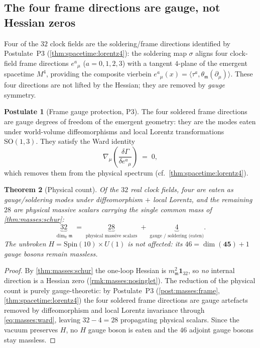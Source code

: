 \documentclass[11pt]{article}
\theoremstyle{plain}
\newtheorem{theorem}{Theorem}[section]
\theoremstyle{definition}
\newtheorem{postulate}[theorem]{Postulate}
\theoremstyle{remark}
\begin{document}
\subsection{The four frame directions are gauge, not Hessian zeros}
\label{sec:masses:frame}

Four of the $32$ clock fields are the soldering/frame directions identified by
Postulate~P3 (\autoref{thm:spacetime:lorentz4}): the soldering map $\sigma$ aligns four
clock-field frame directions $e^{a}{}_{\mu}$ ($a=0,1,2,3$) with a tangent
$4$-plane of the emergent spacetime $M^{4}$, providing the composite vierbein
$e^{a}{}_{\mu}(x)=\langle\tau^{a},\theta_{\mathfrak m}(\partial_{\mu})\rangle$.
These four directions are not lifted by the Hessian; they are removed by
\emph{gauge} symmetry.

\begin{postulate}[Frame gauge protection, P3]\label{post:masses:frame}
The four soldered frame directions are gauge degrees of freedom of the emergent
geometry: they are the modes eaten under world-volume diffeomorphisms and local
Lorentz transformations $\mathrm{SO}(1,3)$. They satisfy the Ward identity
\begin{equation}\label{eq:masses:ward}
  \nabla_{\mu}\!\left(\frac{\delta\Gamma}{\delta e^{a}{}_{\mu}}\right) \;=\; 0,
\end{equation}
which removes them from the physical spectrum (cf.\ \autoref{thm:spacetime:lorentz4}).
\end{postulate}

\begin{theorem}[Physical count]\label{thm:masses:count}
Of the $32$ real clock fields, four are eaten as gauge/soldering modes under
diffeomorphism $+$ local Lorentz, and the remaining $28$ are physical massive
scalars carrying the single common mass of \autoref{thm:masses:schur}:
\begin{equation}\label{eq:masses:count}
  \underbrace{32}_{\dim_{\mathbb R}\mathfrak m}
  \;=\;
  \underbrace{28}_{\text{physical massive scalars}}
  \;+\;
  \underbrace{4}_{\text{gauge / soldering (eaten)}} .
\end{equation}
The unbroken $H=\mathrm{Spin}(10)\times U(1)$ is not affected: its
$46=\dim(\mathbf{45})+1$ gauge bosons remain massless.
\end{theorem}

\begin{proof}
By \autoref{thm:masses:schur} the one-loop Hessian is $m_{\mathfrak m}^{2}
\mathbf 1_{32}$, so \emph{no} internal direction is a Hessian zero
(\autoref{rmk:masses:nosinglet}). The reduction of the physical count is purely
gauge-theoretic: by Postulate~P3 (\autoref{post:masses:frame},
\autoref{thm:spacetime:lorentz4}) the four soldered frame directions are gauge artefacts
removed by diffeomorphism and local Lorentz invariance through
\eqref{eq:masses:ward}, leaving $32-4=28$ propagating physical scalars. Since
the vacuum preserves $H$, no $H$ gauge boson is eaten and the $46$ adjoint
gauge bosons stay massless.
\end{proof}
\end{document}
